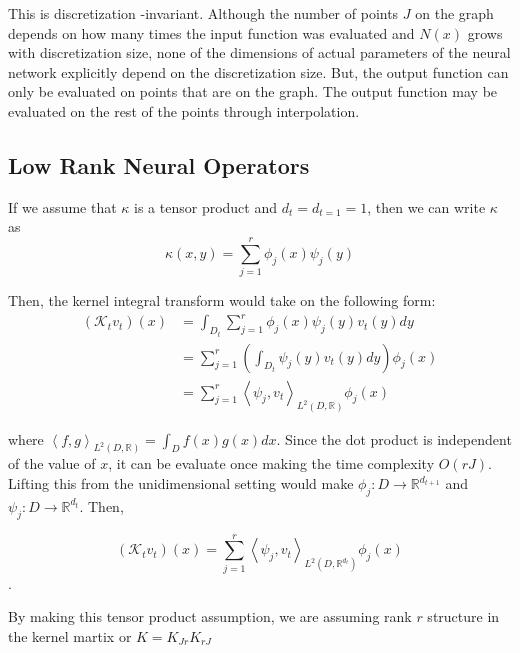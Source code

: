 \documentclass[12pt]{article}
\begin{document}


This is discretization -invariant. Although the number of points $J$ on the graph depends on how many times the input function was evaluated and $N(x)$ grows with discretization size, none of the dimensions of actual parameters of the neural network explicitly depend on the discretization size. But, the output function can only be evaluated on points that are on the graph. The output function may be evaluated on the rest of the points through interpolation. 

\subsection{Low Rank Neural Operators}

If we assume that $\kappa$ is a tensor product and $d_{t} = d_{t = 1} = 1$, then we can write $\kappa$ as 
$$\kappa(x, y) = \sum_{j = 1}^r \phi_j(x)\psi_j(y)$$

Then, the kernel integral transform would take on the following form:
\begin{align*}
    (\mathcal{K}_tv_t)(x) &= \int_{D_t}\sum_{j = 1}^r \phi_j(x)\psi_j(y)v_t(y)dy \\
    &= \sum_{j = 1}^r \left(\int_{D_t} \psi_j(y)v_t(y)dy\right) \phi_j(x) \\
    &= \sum_{j = 1}^r \left< \psi_j,v_t\right>_{L^2(D\dot, \mathbb{R})} \phi_j(x)
\end{align*}

where $\left<f, g\right>_{L^2(D\dot, \mathbb{R})} = \int_{D} f(x)g(x)dx$. Since the dot product is independent of the value of $x$, it can be evaluate once making the time complexity $O(rJ)$. Lifting this from the unidimensional setting would make $\phi_j: D \to \mathbb{R}^{d_{t + 1}}$ and $\psi_j: D \to \mathbb{R}^{d_{t}}$. Then,

$$(\mathcal{K}_tv_t)(x) = \sum_{j = 1}^r \left< \psi_j,v_t\right>_{L^2(D\dot, \mathbb{R}^{d_t})} \phi_j(x)$$.

By making this tensor product assumption, we are assuming rank $r$ structure in the kernel martix or $K = K_{Jr}K_{rJ}$
\end{document}
